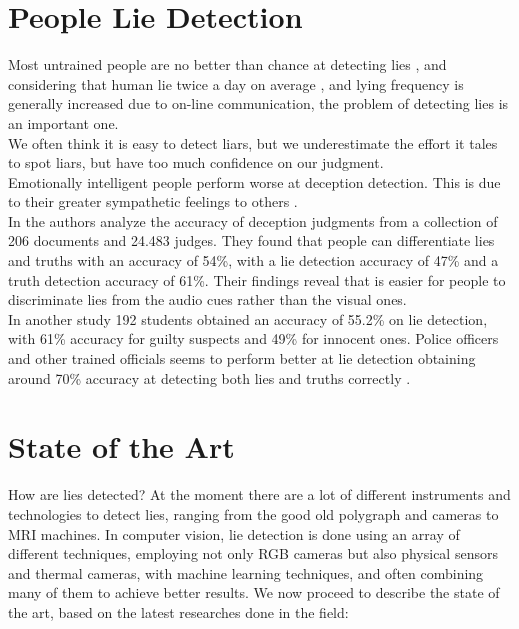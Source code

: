 \pagebreak

\section{People Lie Detection} \label{pplLieDet}
Most untrained people are no better than chance at detecting lies \cite{Porter2012SecretsAL},
and considering that human lie twice a day on average \cite{LyingEverydayLife}, and  lying frequency is generally increased  \cite{DigitalDeception} due to on-line communication, the problem of detecting lies is an important one. \\
We often think it is easy to detect liars, but we underestimate the effort it tales to spot liars, but have too much confidence on our judgment\cite{VrijDLD}. \\
Emotionally intelligent people perform worse at deception detection. This is due to their greater sympathetic feelings to others \cite{EmotionallyIntelligent}. \\
In \cite{BondDePauloAccuracy} the authors analyze the accuracy of deception judgments from a collection of 206 documents and 24.483 judges. They found that people can differentiate lies and truths with an accuracy of 54\%, with a lie detection accuracy of 47\% and a truth detection accuracy of 61\%. Their findings reveal that is easier for people to discriminate lies from the audio cues rather than the visual ones. \\
In another study \cite{HartwigGranhag} 192 students obtained an accuracy of 55.2\% on lie detection, with 61\% accuracy for guilty suspects and 49\% for innocent ones. Police officers and other trained officials seems to perform better at lie detection obtaining around 70\% accuracy at detecting both lies and truths correctly \cite{VrijPoliceDetect}.


\pagebreak

\section{State of the Art} \label{sota}
How are lies detected? At the moment there are a lot of different instruments and technologies to detect lies, ranging from the good old polygraph and cameras to MRI machines. 
In computer vision, lie detection is done using an array of different techniques, employing not only RGB cameras but also physical sensors and thermal cameras, with machine learning techniques, and often combining many of them to achieve better results. 
We now proceed to describe the state of the art, based on the latest researches done in the field:


